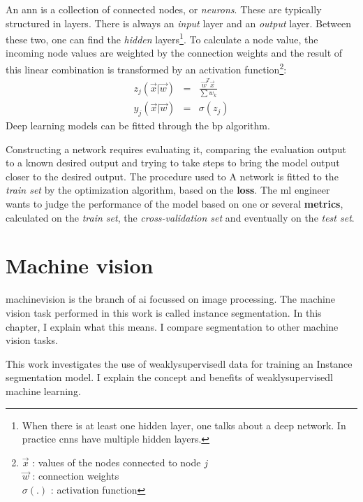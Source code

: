 An \acrshort{ann} is a collection of connected nodes, or \textit{neurons}. 
These are typically structured in layers. 
There is always an \textit{input} layer and an \textit{output} layer. Between these two, one can find the \textit{hidden} layers\footnote{When there is at least one hidden layer, one talks about a deep network. In practice \acrshort{cnn}s have multiple hidden layers.}.
To calculate a node value, the incoming node values are weighted by the connection weights and the result of this linear combination is transformed by an activation function\footnote{
    $\vec{x}$ : values of the nodes connected to node $j$\\
    $\vec{w}$ : connection weights\\
    $\sigma(.)$ : activation function
}:
\begin{eqnarray}
    z_j(\vec{x} | \vec{w}) &=& \frac{\vec{w}^T\vec{x}}{\sum w_k} \\
    y_j(\vec{x} | \vec{w}) &=& \sigma(z_j)
\end{eqnarray}
Deep learning models can be fitted through the \acrfull{bp} algorithm.


Constructing a network requires evaluating it, comparing the evaluation output to a known desired output and trying to take steps to bring the model output closer to the desired output. 
The procedure used to 
A network is fitted to the \textit{train set} by the optimization algorithm, based on the \textbf{loss}.
The \acrshort{ml} engineer wants to judge the performance of the model based on one or several \textbf{metrics}, calculated on the \textit{train set}, the \textit{cross-validation set} and eventually on the \textit{test set}.

\section{Machine vision}

\Gls{machinevision} is the branch of \Gls{ai} focussed on image processing.
The machine vision task performed in this work is called instance \Gls{segmentation}.
In this chapter, I explain what this means. 
I compare segmentation to other machine vision tasks.

This work investigates the use of \Gls{weaklysupervisedl} data for training an Instance segmentation model. 
I explain the concept and benefits of \Gls{weaklysupervisedl} machine learning.

